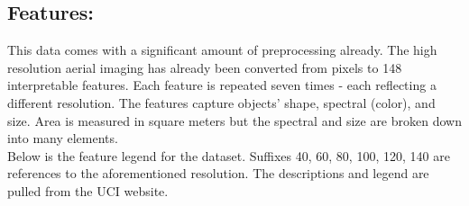 \documentclass[11pt]{article}
\begin{document}
\subsection{Features:}
This data comes with a significant amount of preprocessing already. The high resolution aerial imaging has already been converted from pixels to 148 interpretable features. Each feature is repeated seven times - each reflecting a different resolution. The features capture objects’ shape, spectral (color), and size. Area is measured in square meters but the spectral and size are broken down into many elements.\\

Below is the feature legend for the dataset. Suffixes 40, 60, 80, 100, 120, 140 are references to the aforementioned resolution. The descriptions and legend are pulled from the UCI website.
\end{document}
